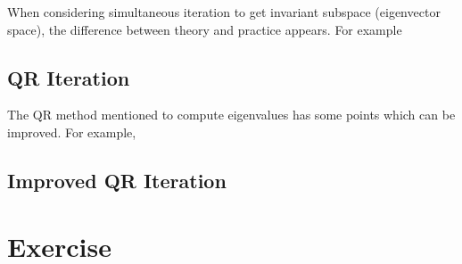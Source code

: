 \documentclass[dvipsnames, 12pt]{article}
\begin{document}


When considering simultaneous iteration to get invariant subspace (eigenvector space), the difference between theory and practice appears. For example




\subsection{QR Iteration}
The QR method mentioned to compute eigenvalues has some points which can be improved. For example,


\subsection{Improved QR Iteration}

\newpage
\section{Exercise}




\end{document}
